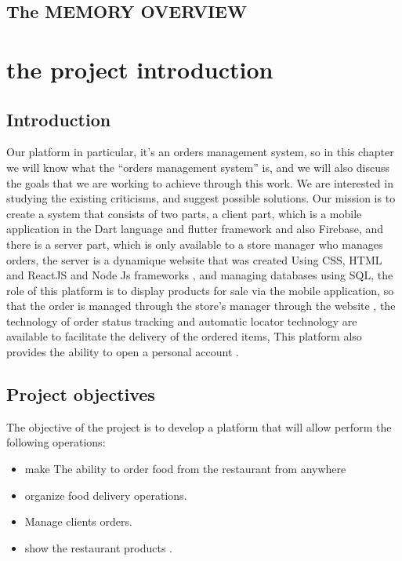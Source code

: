 \documentclass{article}
\begin{document}
\subsection{The MEMORY OVERVIEW}
\section{the project introduction }
\subsection{Introduction}
Our platform in particular, it's an orders management system, so in this chapter we will know what the “orders management system” is, and we will also discuss the goals that we are working to achieve through this work. We are interested in studying the existing criticisms, and suggest possible solutions.
Our mission is to create a system that consists of two parts, a client part, which is a mobile application in the Dart language and flutter framework and also Firebase, and there is a server part, which is only available to a store manager who manages orders, the server is a dynamique website that was created Using  CSS, HTML and ReactJS and Node Js frameworks , and managing databases using SQL, the role of this platform is to display products for sale via the mobile application, so that the order is managed through the store's manager through the website , the technology of order status tracking and automatic locator technology are available to facilitate the delivery of the ordered items, This platform also provides the ability to open a personal account   .
\subsection{Project objectives}
The objective of the project is to develop a platform that will allow
perform the following operations:
\begin{itemize}
\item make The ability to order food from the restaurant from anywhere     
\item organize food delivery operations.    
\item Manage clients orders.
\item show the restaurant products .
\end{itemize}
\end{document}
